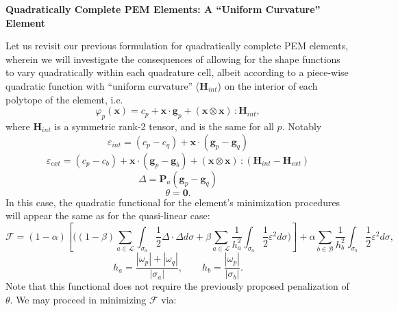 \documentclass[11pt]{article} %
\begin{document}
\newpage

\begin{center}
\textbf{Quadratically Complete PEM Elements: A ``Uniform Curvature'' Element}
\end{center}

Let us revisit our previous formulation for quadratically complete PEM elements, wherein we will investigate the consequences of allowing for the shape functions to vary quadratically within each quadrature cell, albeit according to a piece-wise quadratic function with ``uniform curvature'' ($\mathbf{H}_{int}$) on the interior of each polytope of the element, i.e.
\begin{equation}
	\varphi_p (\mathbf{x}) = c_p + \mathbf{x} \cdot \mathbf{g}_p + (\mathbf{x} \otimes \mathbf{x}) \, \colon \mathbf{H}_{int},
\end{equation}
where $\mathbf{H}_{int}$ is a symmetric rank-2 tensor, and is the same for all $p$. Notably
\begin{equation}
	\varepsilon_{int} = (c_p - c_q) + \mathbf{x} \cdot (\mathbf{g}_p - \mathbf{g}_q)
\end{equation}
\begin{equation}
	\varepsilon_{ext} = (c_p - c_b) + \mathbf{x} \cdot (\mathbf{g}_p - \mathbf{g}_b) + (\mathbf{x} \otimes \mathbf{x}) \, \colon (\mathbf{H}_{int} - \mathbf{H}_{ext})
\end{equation}
\begin{equation}
	\Delta = \mathbf{P}_a ( \mathbf{g}_p - \mathbf{g}_q )
\end{equation}
\begin{equation}
	\theta = \mathbf{0}.
\end{equation}
In this case, the quadratic functional for the element's minimization procedures will appear the same as for the quasi-linear case:
\begin{equation}
	\mathcal{F} = (1-\alpha) \left[ \bigg( (1-\beta) \sum_{a \in \mathcal{L}} \int_{\sigma_a} \frac{1}{2} \Delta \cdot \Delta d \sigma + \beta \sum_{a \in \mathcal{L}} \frac{1}{h_a^2} \int_{\sigma_a} \frac{1}{2} \varepsilon^2 d \sigma \bigg) \right] + \alpha \sum_{b \in \mathcal{B}} \frac{1}{h_b^2} \int_{\sigma_b} \frac{1}{2} \varepsilon^2 d \sigma,
\end{equation}
\begin{equation}
	h_a = \frac{| \omega_p | + | \omega_q |}{| \sigma_a |}, \qquad h_b = \frac{| \omega_p |}{| \sigma_b |}.
\end{equation}
Note that this functional does not require the previously proposed penalization of $\theta$. We may proceed in minimizing $\mathcal{F}$ via:
\end{document}
